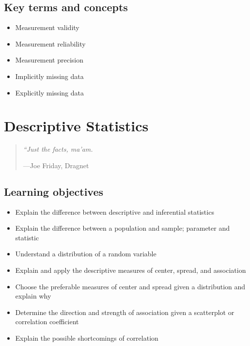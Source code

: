 \documentclass[
]{book}
\providecommand{\tightlist}{%
  \setlength{\itemsep}{0pt}\setlength{\parskip}{0pt}}
\begin{document}
\hypertarget{kt2}{%
\section{Key terms and concepts}\label{kt2}}

\begin{itemize}
\tightlist
\item
  Measurement validity
\item
  Measurement reliability
\item
  Measurement precision
\item
  Implicitly missing data
\item
  Explicitly missing data
\end{itemize}

\hypertarget{descriptive-statistics}{%
\chapter{Descriptive Statistics}\label{descriptive-statistics}}

\begin{quote}
\emph{``Just the facts, ma'am.}

---Joe Friday, Dragnet
\end{quote}

\hypertarget{lo4}{%
\section{Learning objectives}\label{lo4}}

\begin{itemize}
\tightlist
\item
  Explain the difference between descriptive and inferential statistics
\item
  Explain the difference between a population and sample; parameter and statistic
\item
  Understand a distribution of a random variable
\item
  Explain and apply the descriptive measures of center, spread, and association
\item
  Choose the preferable measures of center and spread given a distribution and explain why
\item
  Determine the direction and strength of association given a scatterplot or correlation coefficient
\item
  Explain the possible shortcomings of correlation
\end{itemize}
\end{document}
